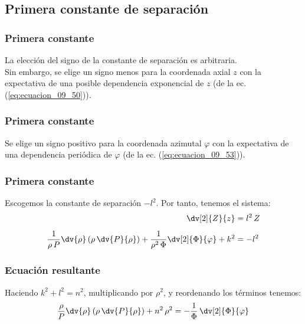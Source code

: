 \subsection{Primera constante de separación}
\begin{frame}
\frametitle{Primera constante}
La elección del signo de la constante de separación es arbitraria.
\\
\bigskip
Sin embargo, se elige un signo menos para la coordenada axial $z$ con la expectativa de una posible dependencia exponencial de $z$ (de la ec. (\ref{eq:ecuacion_09_50})).
\end{frame}
\begin{frame}
\frametitle{Primera constante}
Se elige un signo positivo para la coordenada azimutal $\varphi$ con la expectativa de una dependencia periódica de $\varphi$ (de la ec. (\ref{eq:ecuacion_09_53})).
\end{frame}
\begin{frame}
\frametitle{Primera constante}
Escogemos la constante de separación $- l^{2}$. Por tanto, tenemos el sistema:
\begin{align}
\dv[2]{Z}{z} &= l^{2} \, Z \label{eq:ecuacion_09_50} \\[0.5em]
\dfrac{1}{\rho \, P} \dv{\rho} \left( \rho \, \dv{P}{\rho} \right) + \dfrac{1}{\rho^{2} \, \Phi} \dv[2]{\Phi}{\varphi} + k^{2} &= - l^{2} \label{eq:ecuacion_09_51}
\end{align}
\end{frame}
\begin{frame}
\frametitle{Ecuación resultante}
Haciendo $k^{2} + l^{2} = n^{2}$, multiplicando por $\rho^{2}$, y reordenando los términos tenemos:
\begin{align}
\dfrac{\rho}{P} \dv{\rho} \left( \rho \, \dv{P}{\rho} \right) + n^{2} \, \rho^{2} = - \dfrac{1}{\Phi} \, \dv[2]{\Phi}{\varphi}
\label{eq:ecuacion_09_52}
\end{align}
\end{frame}
